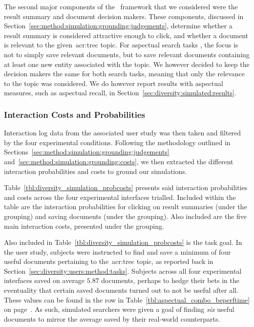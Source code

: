 The second major components of the \simiir~framework that we considered were the result summary and document decision makers. These components, discussed in Section~\ref{sec:method:simulation:grounding:judgements}, determine whether a result summary is considered attractive enough to click, and whether a document is relevant to the given~\gls{acr:trec} topic. For aspectual search tasks , the focus is not to simply save relevant documents, but to save relevant documents containing at least one new entity associated with the topic. We however decided to keep the decision makers the same for both search tasks, meaning that only the relevance to the topic was considered. We do however report results with aspectual measures, such as aspectual recall, in Section~\ref{sec:diversity:simulated:results}.

\subsubsection{Interaction Costs and Probabilities}\label{sec:diversity:simulated:method:probscosts}
Interaction log data from the associated user study was then taken and filtered by the four experimental conditions. Following the methodology outlined in Sections~\ref{sec:method:simulation:grounding:judgements} and~\ref{sec:method:simulation:grounding:costs}, we then extracted the different interaction probabilities and costs to ground our simulations.

Table~\ref{tbl:diversity_simulation_probcosts} presents said interaction probabilities and costs across the four experimental interfaces trialled. Included within the table are the interaction probabilities for clicking on result summaries (under the  grouping) and saving documents (under the  grouping). Also included are the five main interaction costs, presented under the  grouping.

Also included in Table~\ref{tbl:diversity_simulation_probcosts} is the task goal. In the user study, subjects were instructed to find and save a minimum of four useful documents pertaining to the~\gls{acr:trec} topic, as reported back in Section~\ref{sec:diversity:users:method:tasks}. Subjects across all four experimental interfaces saved on average $5.87$ documents, perhaps to hedge their bets in the eventuality that certain saved documents turned out to not be useful after all. These values can be found in the  row in Table~\ref{tbl:aspectual_combo_beperftime} on page~\pageref{tbl:aspectual_combo_beperftime}. As such, simulated searchers were given a goal of finding \emph{six} useful documents to mirror the average saved by their real-world counterparts.

